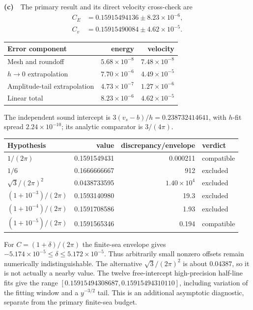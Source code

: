 \documentclass[11pt,a4paper]{article}
\newcommand{\Lc}{\textbf{(c)}\ }
\begin{document}
\Lc\ The primary result and its direct velocity cross-check are
\begin{align*}
 C_E&=0.15915494136\pm 8.23\times10^{-6},\\
 C_v&=0.15915490084\pm 4.62\times10^{-5}.
\end{align*}
\begin{center}
\begin{tabular}{lrr}\toprule
Error component & energy & velocity\\\midrule
Mesh and roundoff & $5.68\times10^{-8}$ & $7.48\times10^{-8}$ \\
$h\to0$ extrapolation & $7.70\times10^{-6}$ & $4.49\times10^{-5}$ \\
Amplitude-tail extrapolation & $4.73\times10^{-7}$ & $1.27\times10^{-6}$ \\
Linear total & $8.23\times10^{-6}$ & $4.62\times10^{-5}$ \\
\bottomrule\end{tabular}\end{center}
The independent sound intercept is $3(v_s-b)/h=0.238732414641$, with $h$-fit spread $2.24\times10^{-10}$; its analytic comparator is $3/(4\pi)$.
\begin{center}\small
\begin{tabular}{lrrl}\toprule
Hypothesis & value & discrepancy/envelope & verdict\\\midrule
$1/(2\pi)$ & 0.1591549431 & 0.000211 & compatible \\
$1/6$ & 0.1666666667 & 912 & excluded \\
$\sqrt3/(2\pi)^2$ & 0.0438733595 & $1.40\times10^4$ & excluded \\
$(1+10^{-3})/(2\pi)$ & 0.1593140980 & 19.3 & excluded \\
$(1+10^{-4})/(2\pi)$ & 0.1591708586 & 1.93 & excluded \\
$(1+10^{-5})/(2\pi)$ & 0.1591565346 & 0.194 & compatible \\
\bottomrule\end{tabular}\end{center}
For $C=(1+\delta)/(2\pi)$ the finite-sea envelope gives $-5.174\times10^{-5}\leq\delta\leq 5.172\times10^{-5}$. Thus arbitrarily small nonzero offsets remain numerically indistinguishable. The alternative $\sqrt3/(2\pi)^2$ is about $0.04387$, so it is not actually a nearby value.
The twelve free-intercept high-precision half-line fits give the range $[0.15915494308687,0.15915494310110]$, including variation of the fitting window and a $y^{-3/2}$ tail. This is an additional asymptotic diagnostic, separate from the primary finite-sea budget.
\end{document}
